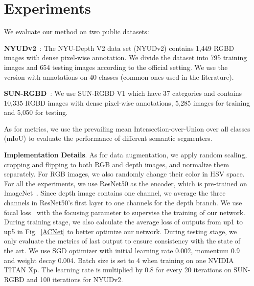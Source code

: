\documentclass{article}
\begin{document}
\section{Experiments}
\label{sec:experiments}

We evaluate our method on two public datasets: 

\textbf{NYUDv2}~\cite{silberman2012indoornyu}: The NYU-Depth V2 data set (NYUDv2) contains 1,449 RGBD images with dense pixel-wise annotation. We divide the dataset into 795 training images and 654 testing images according to the official setting. We use the version with annotations on 40 classes (common ones used in the literature).


\textbf{SUN-RGBD}~\cite{song2015sun}: We use SUN-RGBD V1 which have 37 categories and contains 10,335 RGBD images with dense pixel-wise annotations, 5,285 images for training and 5,050 for testing.


As for metrics, we use the prevailing mean Intersection-over-Union over all classes (mIoU) to evaluate the performance of different semantic segmenters. 







\textbf{Implementation Details}. As for data augmentation, we apply random scaling, cropping and flipping to both RGB and depth images, and normalize them separately. For RGB images, we also randomly change their color in HSV space. For all the experiments, we use ResNet50 as the encoder, which is pre-trained on ImageNet~\cite{russakovsky2015imagenet}. Since depth image contains one channel, we average the three channels in ResNet50's first layer to one channels for the depth branch. We use focal loss~\cite{lin2018focalloss} with the focusing parameter  to supervise the training of our network. During training stage, we also calculate the average loss of outputs from up1 to up5 in Fig.~\ref{ACNet} to better optimize our network. During testing stage, we only evaluate the metrics of last output to ensure consistency with the state of the art. We use SGD optimizer with initial learning rate 0.002, momentum 0.9 and weight decay 0.004. Batch size is set to 4 when training on one NVIDIA TITAN Xp. The learning rate is multiplied by 0.8 for every 20 iterations on SUN-RGBD and 100 iterations for NYUDv2.

\end{document}
